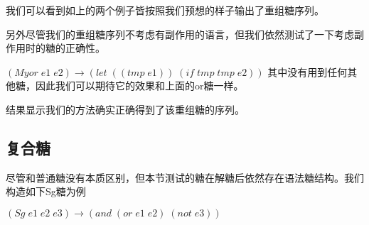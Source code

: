 我们可以看到如上的两个例子皆按照我们预想的样子输出了重组糖序列。

另外尽管我们的重组糖序列不考虑有副作用的语言，但我们依然测试了一下考虑副作用时的糖的正确性。

$(Myor\;e1\;e2)→(let\;((tmp\;e1))\;(if\;tmp\;tmp\;e2))$
其中没有用到任何其他糖，因此我们可以期待它的效果和上面的or糖一样。

\begin{center}
\end{center}
结果显示我们的方法确实正确得到了该重组糖的序列。

\subsection{复合糖}

尽管和普通糖没有本质区别，但本节测试的糖在解糖后依然存在语法糖结构。我们构造如下Sg糖为例

$(Sg\;e1\;e2\;e3)→(and\;(or\;e1\;e2)\;(not\;e3))$

\begin{center}
\end{center}


